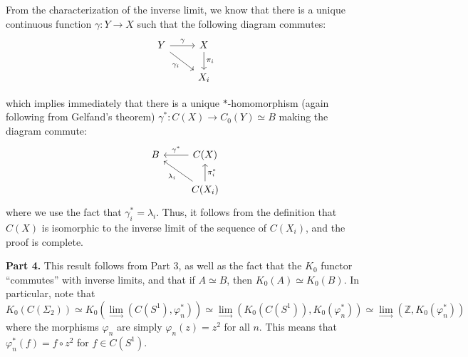 \documentclass[aps,pra,showpacs,notitlepage,onecolumn,superscriptaddress,nofootinbib]{revtex4-1}
\theoremstyle{definition}
\begin{document}
From the characterization of the inverse limit, we know that there is a unique continuous function $\gamma : Y \rightarrow X$ such that the following diagram commutes:
\[\begin{tikzcd}
Y & X \\
& {X_i}
\arrow["\gamma", from=1-1, to=1-2]
\arrow["{\pi_i}", from=1-2, to=2-2]
\arrow["{\gamma_i}"', from=1-1, to=2-2]
\end{tikzcd}\]

which implies immediately that there is a unique $*$-homomorphism (again following from Gelfand's theorem) $\gamma^{*}: C(X) \rightarrow C_0(Y) \simeq B$ making the diagram commute:
\[\begin{tikzcd}
B & {C(X)} \\
& {C(X_i)}
\arrow["{\gamma^{*}}"', from=1-2, to=1-1]
\arrow["{\pi_i^{*}}"', from=2-2, to=1-2]
\arrow["{\lambda_i}", from=2-2, to=1-1]
\end{tikzcd}\]
where we use the fact that $\gamma_i^{*} = \lambda_i$. Thus, it follows from the definition that $C(X)$ is isomorphic to the inverse limit of the sequence of $C(X_i)$, and the proof is complete.
\newline

\noindent \textbf{Part 4.} This result follows from Part 3, as well as the fact that the $K_0$ functor ``commutes'' with inverse limits, and that if $A \simeq B$, then $K_0(A) \simeq K_0(B)$. In particular, note that
\begin{equation}
  K_0(C(\Sigma_2)) \simeq K_0(\lim_{\longrightarrow} (C(S^1), \varphi_n^{*}) ) \simeq \lim_{\longrightarrow} (K_0\left( C(S^1) \right), K_0(\varphi_n^{*})) \simeq \lim_{\longrightarrow}(\mathbb{Z}, K_0(\varphi_n^{*}))
\end{equation}
where the morphisms $\varphi_n$ are simply $\varphi_n(z) = z^2$ for all $n$. This means that $\varphi_n^{*}(f) = f \circ z^2$ for $f \in C(S^1)$. 
\end{document}
